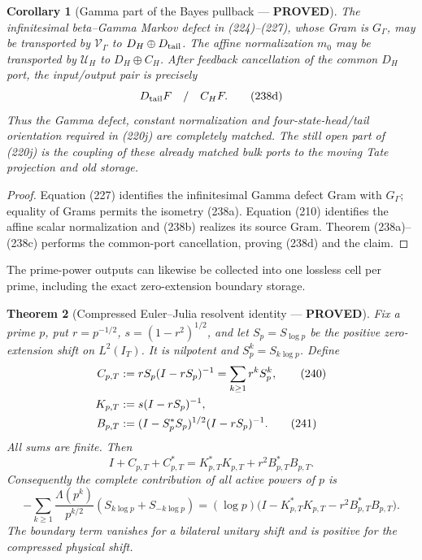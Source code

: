 \documentclass[11pt]{article}
\newtheorem{theorem}{Theorem}
\newtheorem{corollary}[theorem]{Corollary}
\newcommand{\PROVED}{\textcolor{green!45!black}{\textbf{PROVED}}}
\begin{document}
\begin{corollary}[Gamma part of the Bayes pullback --- \PROVED]
The infinitesimal beta--Gamma Markov defect in (224)--(227), whose Gram is
$G_\Gamma$, may be transported by $\mathcal V_\Gamma$ to
$D_H\oplus D_{\rm tail}$.  The affine normalization $m_0$ may be transported
by $\mathcal U_H$ to $D_H\oplus C_H$.  After feedback cancellation of the
common $D_H$ port, the input/output pair is precisely
\begin{equation}
             D_{\rm tail}F\quad/\quad C_HF.          \tag{238d}
\end{equation}
Thus the Gamma defect, constant normalization and four-state-head/tail
orientation required in (220j) are completely matched.  The still open part
of (220j) is the coupling of these already matched bulk ports to the moving
Tate projection and old storage.
\end{corollary}

\begin{proof}
Equation (227) identifies the infinitesimal Gamma defect Gram with
$G_\Gamma$; equality of Grams permits the isometry (238a).  Equation (210)
identifies the affine scalar normalization and (238b) realizes its source
Gram.  Theorem (238a)--(238c) performs the common-port cancellation, proving
(238d) and the claim.
\end{proof}

The prime-power outputs can likewise be collected into one lossless cell per
prime, including the exact zero-extension boundary storage.

\begin{theorem}[Compressed Euler--Julia resolvent identity --- \PROVED]
Fix a prime $p$, put $r=p^{-1/2}$, $s=(1-r^2)^{1/2}$, and let
$S_p=S_{\log p}$ be the positive zero-extension shift on $L^2(I_T)$.  It is
nilpotent and $S_p^k=S_{k\log p}$.  Define
\begin{align}
 C_{p,T}&:=rS_p(I-rS_p)^{-1}
          =\sum_{k\ge1}r^kS_p^k,                     \tag{240}\\
 K_{p,T}&:=s(I-rS_p)^{-1},\notag\\
 B_{p,T}&:=(I-S_p^*S_p)^{1/2}(I-rS_p)^{-1}.          \tag{241}
\end{align}
All sums are finite.  Then
\begin{equation}
 \boxed{I+C_{p,T}+C_{p,T}^*
 =K_{p,T}^*K_{p,T}+r^2B_{p,T}^*B_{p,T}.}             \tag{242}
\end{equation}
Consequently the complete contribution of all active powers of $p$ is
\begin{equation}
 -\sum_{k\ge1}\frac{\Lambda(p^k)}{p^{k/2}}
   (S_{k\log p}+S_{-k\log p})
 = (\log p)\bigl(I-K_{p,T}^*K_{p,T}
                    -r^2B_{p,T}^*B_{p,T}\bigr).      \tag{243}
\end{equation}
The boundary term vanishes for a bilateral unitary shift and is positive for
the compressed physical shift.
\end{theorem}
\end{document}
